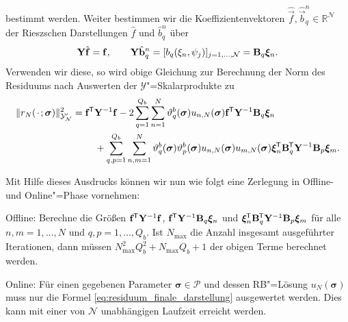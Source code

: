 \documentclass[../main.tex]{subfiles}
\begin{document}
bestimmt werden.
Weiter bestimmen wir die Koeffizientenvektoren $\hat{\vec{f}}, \hat{\vec{b}}^{n}_{q} \in \mathbb{R}^{\mathcal N}$ der Rieszschen Darstellungen $\hat{f}$ und $\hat{b}^{n}_{q}$ über
\begin{equation}
    \mathbf{Y} \hat{\mathbf{f}} = \mathbf{f},
    \qquad
    \mathbf{Y} \hat{\mathbf{b}}^{n}_{q} = [b_{q}(\xi_{n}, \psi_{j})]_{j = 1, \dots, \mathcal N} = \mathbf{B}_{q} \bm \xi_{n}.
\end{equation}
Verwenden wir diese, so wird obige Gleichung zur Berechnung der Norm des Residuums nach Auswerten der $\mathcal Y$"=Skalarprodukte zu
\begin{equation}\label{eq:residuum_finale_darstellung}
    \begin{aligned}
        \norm{r_{N}(\blank; \bm \sigma)}_{\mathcal Y_{\mathcal N}'}^{2}
        = \begin{multlined}[t]
            \vec{f}\tran \mat{Y}^{-1} \vec{f}
                - 2 \sum_{q = 1}^{Q_b} \sum_{n = 1}^{N} \theta_{q}^{b}(\bm \sigma) u_{n,N}(\bm \sigma) \vec{f}\tran \mat{Y}^{-1} \mat{B}_{q} \bm \xi_{n}
                \\+ \sum_{q, p = 1}^{Q_b} \sum_{n, m = 1}^{N} \theta_{q}^{b}(\bm \sigma) \theta_{p}^{b}(\bm \sigma) u_{n,N}(\bm \sigma) u_{m,N}(\bm \sigma) \bm \xi_{n}\tran \mat{B}_{q}\tran \mat{Y}^{-1} \mat{B}_{p} \bm \xi_{m}.
        \end{multlined}
    \end{aligned}
\end{equation}

Mit Hilfe dieses Ausdrucks können wir nun wie folgt eine Zerlegung in Offline- und Online"=Phase vornehmen:

\begin{onoffdescription}
    \item[Offline:] Berechne die Größen $\mathbf{f}^{\mkern-1.5mu\mathsf{T}} \mathbf{Y}^{-1} \mathbf{f}$, $\mathbf{f}^{\mkern-1.5mu\mathsf{T}} \mathbf{Y}^{-1} \mathbf{B}_{q} \bm \xi_{n}$ und $\bm \xi_{n}^{\mkern-1.5mu\mathsf{T}} \mathbf{B}_{q}^{\mkern-1.5mu\mathsf{T}} \mathbf{Y}^{-1} \mathbf{B}_{p} \bm \xi_{m}$ für alle $n, m = 1, \dots, N$ und $q, p = 1, \dots, Q_b$.
    Ist $N_{\max}$ die Anzahl insgesamt ausgeführter Iterationen, dann müssen $N_{\max}^2 Q_{b}^{2} + N_{\max} Q_{b} + 1$ der obigen Terme berechnet werden.

    \item[Online:] Für einen gegebenen Parameter $\bm \sigma \in \mathcal P$ und dessen RB"=Lösung $u_{N}(\bm \sigma)$ muss nur die Formel \cref{eq:residuum_finale_darstellung} ausgewertet werden.
    Dies kann mit einer von $\mathcal N$ unabhängigen Laufzeit erreicht werden.
\end{onoffdescription}
\end{document}
